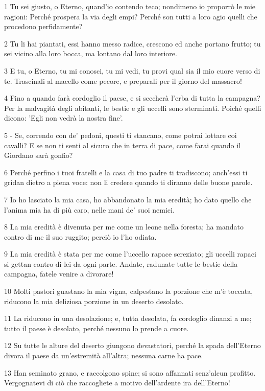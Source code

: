 \par 1 Tu sei giusto, o Eterno, quand'io contendo teco; nondimeno io proporrò le mie ragioni: Perché prospera la via degli empi? Perché son tutti a loro agio quelli che procedono perfidamente?
\par 2 Tu li hai piantati, essi hanno messo radice, crescono ed anche portano frutto; tu sei vicino alla loro bocca, ma lontano dal loro interiore.
\par 3 E tu, o Eterno, tu mi conosci, tu mi vedi, tu provi qual sia il mio cuore verso di te. Trascinali al macello come pecore, e preparali per il giorno del massacro!
\par 4 Fino a quando farà cordoglio il paese, e si seccherà l'erba di tutta la campagna? Per la malvagità degli abitanti, le bestie e gli uccelli sono sterminati. Poiché quelli dicono: 'Egli non vedrà la nostra fine'.
\par 5 - Se, correndo con de' pedoni, questi ti stancano, come potrai lottare coi cavalli? E se non ti senti al sicuro che in terra di pace, come farai quando il Giordano sarà gonfio?
\par 6 Perché perfino i tuoi fratelli e la casa di tuo padre ti tradiscono; anch'essi ti gridan dietro a piena voce: non li credere quando ti diranno delle buone parole.
\par 7 Io ho lasciato la mia casa, ho abbandonato la mia eredità; ho dato quello che l'anima mia ha di più caro, nelle mani de' suoi nemici.
\par 8 La mia eredità è divenuta per me come un leone nella foresta; ha mandato contro di me il suo ruggito; perciò io l'ho odiata.
\par 9 La mia eredità è stata per me come l'uccello rapace screziato; gli uccelli rapaci si gettan contro di lei da ogni parte. Andate, radunate tutte le bestie della campagna, fatele venire a divorare!
\par 10 Molti pastori guastano la mia vigna, calpestano la porzione che m'è toccata, riducono la mia deliziosa porzione in un deserto desolato.
\par 11 La riducono in una desolazione; e, tutta desolata, fa cordoglio dinanzi a me; tutto il paese è desolato, perché nessuno lo prende a cuore.
\par 12 Su tutte le alture del deserto giungono devastatori, perché la spada dell'Eterno divora il paese da un'estremità all'altra; nessuna carne ha pace.
\par 13 Han seminato grano, e raccolgono spine; si sono affannati senz'alcun profitto. Vergognatevi di ciò che raccogliete a motivo dell'ardente ira dell'Eterno!
